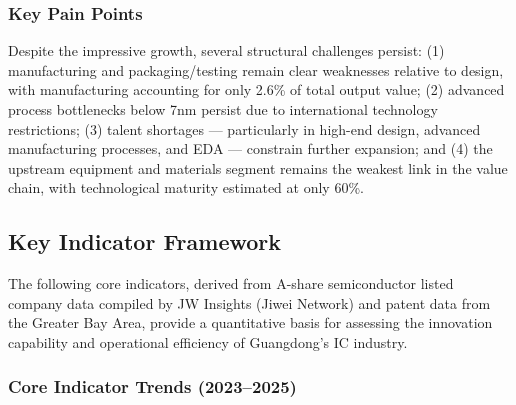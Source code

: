 \documentclass[12pt,a4paper]{article}
\begin{document}
\subsubsection{Key Pain Points}

Despite the impressive growth, several structural challenges persist:
(1) manufacturing and packaging/testing remain clear weaknesses relative to
design, with manufacturing accounting for only 2.6\% of total output value;
(2) advanced process bottlenecks below 7nm persist due to international
technology restrictions; (3) talent shortages — particularly in high-end
design, advanced manufacturing processes, and EDA — constrain further
expansion; and (4) the upstream equipment and materials segment remains the
weakest link in the value chain, with technological maturity estimated at
only 60\%.

\subsection{Key Indicator Framework}
\label{sec:indicators}

The following core indicators, derived from A-share semiconductor listed company
data compiled by JW Insights (Jiwei Network) and patent data from the Greater Bay
Area, provide a quantitative basis for assessing the innovation capability and
operational efficiency of Guangdong's IC industry.

\subsubsection{Core Indicator Trends (2023--2025)}
\end{document}
